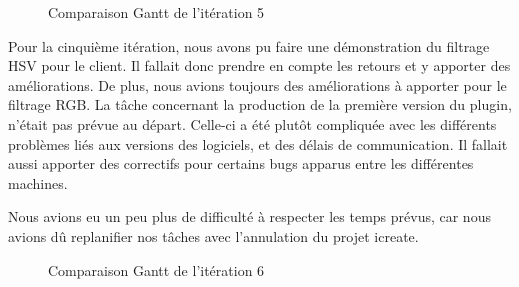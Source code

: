 \documentclass[12pt,titlepage,french]{article}
\begin{document}
\begin{figure}[H]
    \caption{\label{} Comparaison Gantt de l'itération 5}
\end{figure}

Pour la cinquième itération, nous avons pu faire une démonstration du filtrage HSV pour le client. Il fallait donc prendre en compte les retours et y apporter des améliorations. De plus, nous avions toujours des améliorations à apporter pour le filtrage RGB. La tâche concernant la production de la première version du plugin, n'était pas prévue au départ. Celle-ci a été plutôt compliquée avec les différents problèmes liés aux versions des logiciels, et des délais de communication. Il fallait aussi apporter des correctifs pour certains bugs apparus entre les différentes machines. \newline

Nous avions eu un peu plus de difficulté à respecter les temps prévus, car nous avions dû replanifier nos tâches avec l'annulation du projet icreate.

\begin{figure}[H]
    \caption{\label{} Comparaison Gantt de l'itération 6}
\end{figure}
\end{document}
